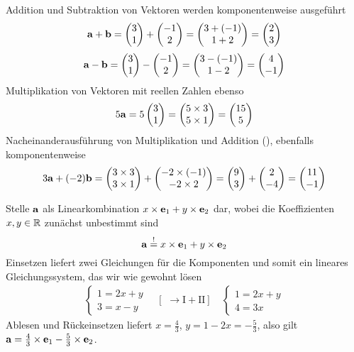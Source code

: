 \documentclass[11pt]{scrartcl}
\begin{document}
\begin{solution}
  \begin{subex}
  \item Addition und Subtraktion von Vektoren werden komponentenweise ausgeführt
  \[
    \mathbf{a} + \mathbf{b} = \begin{pmatrix} 3 \\ 1 \end{pmatrix} + \begin{pmatrix} -1 \\ 2 \end{pmatrix} = \begin{pmatrix} 3 + (-1) \\ 1 + 2 \end{pmatrix} = \begin{pmatrix} 2 \\ 3 \end{pmatrix}
  \]
  \[
    \mathbf{a} - \mathbf{b} = \begin{pmatrix} 3 \\ 1 \end{pmatrix} - \begin{pmatrix} -1 \\ 2 \end{pmatrix} = \begin{pmatrix} 3 - (-1) \\ 1 - 2 \end{pmatrix} = \begin{pmatrix} 4 \\ -1 \end{pmatrix}
  \]
  Multiplikation von Vektoren mit reellen Zahlen ebenso
  \[
    5 \mathbf{a} = 5 \begin{pmatrix} 3 \\ 1 \end{pmatrix} = \begin{pmatrix} 5 \times 3 \\ 5 \times 1 \end{pmatrix} = \begin{pmatrix} 15 \\ 5 \end{pmatrix}
  \]
  Nacheinanderausführung von Multiplikation und Addition (), ebenfalls komponentenweise
  \[
    3 \mathbf{a} + (-2) \mathbf{b} = \begin{pmatrix} 3 \times 3 \\ 3 \times 1 \end{pmatrix} + \begin{pmatrix} -2 \times (-1) \\ -2 \times 2 \end{pmatrix}
    = \begin{pmatrix} 9 \\ 3 \end{pmatrix} + \begin{pmatrix} 2 \\ -4 \end{pmatrix} = \begin{pmatrix} 11 \\ -1 \end{pmatrix}
  \]

  \item Stelle $\mathbf{a}$ als Linearkombination $x\times \mathbf{e}_1 + y\times \mathbf{e}_2$ dar, wobei die Koeffizienten $x,y \in \mathbb{R}$ zunächst unbestimmt sind
  \[
    \mathbf{a} \stackrel{!}{=} x \times \mathbf{e}_1 + y \times \mathbf{e}_2
  \]
  Einsetzen liefert zwei Gleichungen für die Komponenten und somit ein lineares Gleichungssystem, das wir wie gewohnt lösen
  \begin{align*}
    \left\{ \begin{array}{l}1 = 2x + y \\  3 = x - y \end{array} \right. \quad [\,\,\rightarrow \mathrm{I + II}] \quad \left\{ \begin{array}{l}1 = 2x + y  \\  4 = 3x \end{array} \right.
  \end{align*}
  Ablesen und Rückeinsetzen liefert $x = \frac{4}{3}$, $y = 1 - 2x = -\frac{5}{3}$, also gilt $\mathbf{a} = \frac{4}{3}\times\mathbf{e}_1 - \frac{5}{3}\times \mathbf{e}_2$.
  \end{subex}
\end{solution}
\end{document}
